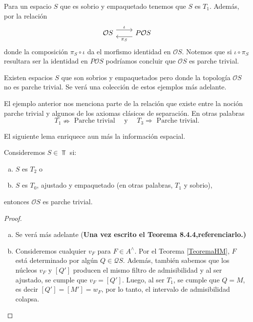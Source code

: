 Para un espacio $S$ que es sobrio y empaquetado tenemos que $S$ es $T_1$. Además, por la relación 
\[\begin{tikzcd}
	{\mathcal{O}S} & {P\mathcal{O}S}
	\arrow["\iota", shift left=2, from=1-1, to=1-2]
	\arrow["{\pi_S}", shift left=2, from=1-2, to=1-1]
\end{tikzcd}\]
donde la composición $\pi_S\circ\iota$ da el morfismo identidad en $\mathcal{O}S$. Notemos que si $\iota\circ \pi_S$ resultara ser la identidad en $P\mathcal{O}S$ podríamos concluir que $\mathcal{O}S$ es parche trivial.

\begin{ej}\label{Ejemplo8.1.3}
    Existen espacios $S$ que son sobrios y empaquetados pero donde la topología $\mathcal{O}S$ no es parche trivial. Se verá una colección de estos ejemplos más adelante.
\end{ej}

El ejemplo anterior nos menciona parte de la relación que existe entre la noción parche trivial y algunos de los axiomas clásicos de separación. En otras palabras
\[
T_1\nRightarrow \mbox{ Parche trivial} \quad \mbox{ y }\quad T_3\Rightarrow \mbox{ Parche trivial}.
\]

El siguiente lema enriquece aun más la información espacial.

\begin{lem}\label{Lema8.1.4}
    Consideremos $S\in \Top$ si:
    \begin{enumerate}[a)]
        \item $S$ es $T_2$ o
        \item $S$ es $T_0$, ajustado y empaquetado (en otras palabras, $T_1$ y sobrio),
    \end{enumerate}
    entonces $\mathcal{O}S$ es parche trivial.
\end{lem}

\begin{proof}
    \begin{enumerate}[a)]
        \item Se verá más adelante (\textbf{Una vez escrito el Teorema 8.4.4,referenciarlo.)}
        \item Consideremos cualquier $v_F$ para $F\in A^\wedge$. Por el Teorema \ref{TeoremaHM}, $F$ está determinado por algún $Q\in \mathcal{Q}S$. Además, también sabemos que los núcleos $v_F$ y $[Q']$ producen el mismo filtro de admisibilidad y al ser ajustado, se cumple que $v_F=[Q']$. Luego, al ser $T_1$, se cumple que $Q=M$, es decir $[Q']=[M']=w_F$, por lo tanto, el intervalo de admisibilidad colapsa.
    \end{enumerate}
\end{proof}

